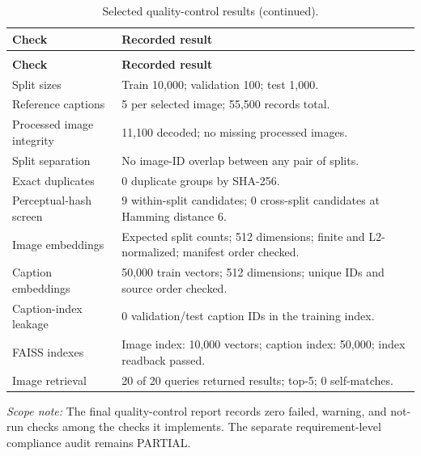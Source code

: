 \small
\begin{longtable}{@{}p{}p{}@{}}
\caption{Selected results from the saved final pipeline quality-control report.}
\label{tab:qc-summary}\\
\toprule
\textbf{Check} & \textbf{Recorded result}\\
\midrule
\endfirsthead
\caption[]{Selected quality-control results (continued).}\\
\toprule
\textbf{Check} & \textbf{Recorded result}\\
\midrule
\endhead
\rowcolors{2}{ProjectGrey}{white}
Split sizes & Train 10,000; validation 100; test 1,000.\\
Reference captions & 5 per selected image; 55,500 records total.\\
Processed image integrity & 11,100 decoded; no missing processed images.\\
Split separation & No image-ID overlap between any pair of splits.\\
Exact duplicates & 0 duplicate groups by SHA-256.\\
Perceptual-hash screen & 9 within-split candidates; 0 cross-split candidates at Hamming distance 6.\\
Image embeddings & Expected split counts; 512 dimensions; finite and L2-normalized; manifest order checked.\\
Caption embeddings & 50,000 train vectors; 512 dimensions; unique IDs and source order checked.\\
Caption-index leakage & 0 validation/test caption IDs in the training index.\\
FAISS indexes & Image index: 10,000 vectors; caption index: 50,000; index readback passed.\\
Image retrieval & 20 of 20 queries returned results; top-5; 0 self-matches.\\
\bottomrule
\end{longtable}

\smallskip
\textit{Scope note:} The final quality-control report records zero failed, warning, and not-run checks among the checks it implements. The separate requirement-level compliance audit remains PARTIAL.
